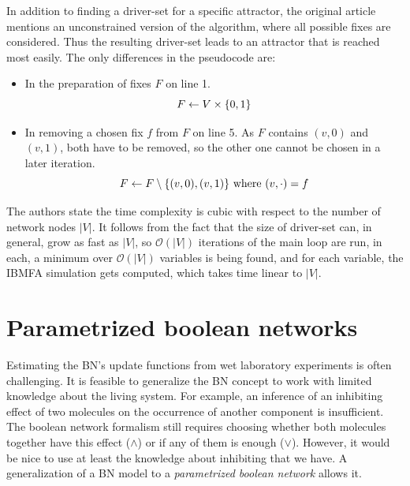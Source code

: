 \documentclass[
	digital, oneside, nosansbold, nocolorbold, nolot, nolof
]{fithesis4}
\theoremstyle{definition}
\theoremstyle{definition}
\DeclarePairedDelimiter{\set}{\{}{\}}
\begin{document}
In addition to finding a driver-set for a specific attractor, the original
article mentions an unconstrained version of the algorithm, where all possible
fixes are considered. Thus the resulting driver-set leads to an attractor that
is reached most easily. The only differences in the pseudocode are:
\begin{itemize}
    \item In the preparation of fixes $F$ on line 1.
        \[
            F \gets V \times \set{0, 1}
        \]
    \item In removing a chosen fix $f$ from $F$ on line 5. As $F$ contains
        $(v, 0)$ and $(v, 1)$, both have to be removed, so the other one
        cannot be chosen in a later iteration.
        \[
            F \gets F \setminus \set{(v, 0), (v, 1)}
                \text{ where } (v, \cdot) = f
        \]
\end{itemize}
The authors state the time complexity is cubic with respect to the number of
network nodes $|V|$. It follows from the fact that the size of driver-set can,
in general, grow as fast as $|V|$, so $\mathcal{O}(|V|)$ iterations of the main
loop are run, in each, a minimum over $\mathcal{O}(|V|)$ variables is being
found, and for each variable, the IBMFA simulation gets computed, which takes
time linear to $|V|$.


\section{Parametrized boolean networks}

Estimating the BN's update functions from wet laboratory experiments is often
challenging. It is feasible to generalize the BN concept to work with limited
knowledge about the living system. For example, an inference of an inhibiting
effect of two molecules on the occurrence of another component is insufficient.
The boolean network formalism still requires choosing whether both molecules
together have this effect ($\land$) or if any of them is enough ($\lor$).
However, it would be nice to use at least the knowledge about inhibiting that
we have. A generalization of a BN model to a \emph{parametrized boolean network}
allows it.
\end{document}
